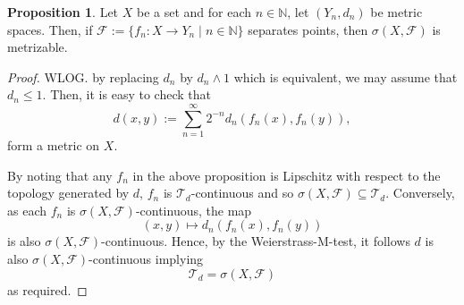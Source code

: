 \documentclass[]{article}
\theoremstyle{definition}
\newtheorem{proposition}{Proposition}[section]
\begin{document}
\begin{proposition}
  Let \(X\) be a set and for each \(n \in \mathbb{N}\), let \((Y_n, d_n)\) be metric spaces. Then, if 
  \(\mathcal{F} := \{f_n : X \to Y_n \mid n \in \mathbb{N}\}\) separates points, then \(\sigma(X, \mathcal{F})\)
  is metrizable.
\end{proposition}
\begin{proof}
  WLOG. by replacing \(d_n\) by \(d_n \wedge 1\) which is equivalent, we may assume that \(d_n \le 1\). 
  Then, it is easy to check that 
  \[d(x, y) := \sum_{n = 1}^\infty 2^{-n} d_n(f_n(x), f_n(y)),\]
  form a metric on \(X\). 

  By noting that any \(f_n\) in the above proposition is Lipschitz with respect to the topology generated 
  by \(d\), \(f_n\) is \(\mathcal{T}_d\)-continuous and so \(\sigma(X, \mathcal{F}) \subseteq \mathcal{T}_d\). Conversely, 
  as each \(f_n\) is \(\sigma(X, \mathcal{F})\)-continuous, the map 
  \[(x, y) \mapsto d_n(f_n(x), f_n(y))\]
  is also \(\sigma(X, \mathcal{F})\)-continuous. Hence, by the Weierstrass-M-test, it follows \(d\) is also 
  \(\sigma(X, \mathcal{F})\)-continuous implying 
  \[\mathcal{T}_d = \sigma(X, \mathcal{F})\]
  as required.
\end{proof}
\end{document}
